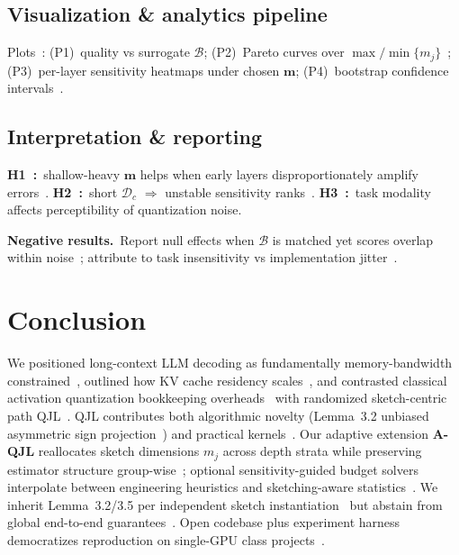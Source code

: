\documentclass[conference]{IEEEtran}
\begin{document}
\subsection{Visualization \& analytics pipeline}

Plots~\cite{presentation_mqjl}: (P1)~quality vs surrogate \(\mathcal{B}\); (P2)~Pareto curves over \(\max/\min\{m_j\}\)~\cite{fpguide2018}; (P3)~per-layer sensitivity heatmaps under chosen \(\mathbf{m}\); (P4)~bootstrap confidence intervals~\cite{presentation_mqjl}.

\subsection{Interpretation \& reporting}

\textbf{H1~\cite{fpguide2018}:}\ shallow-heavy \(\mathbf{m}\) helps when early layers disproportionately amplify errors~\cite{lipschitz2024}. \textbf{H2~\cite{presentation_mqjl}:}\ short \(\mathcal{D}_c\) \(\Rightarrow\) unstable sensitivity ranks~\cite{rudelson2014}. \textbf{H3~\cite{bai2023longbench}:}\ task modality affects perceptibility of quantization noise.

\textbf{Negative results.}\ Report null effects when \(\mathcal{B}\) is matched yet scores overlap within noise~\cite{presentation_mqjl}; attribute to task insensitivity vs implementation jitter~\cite{qjlkernel}.

\section{Conclusion}
\label{sec:conclusion}

We positioned long-context LLM decoding as fundamentally memory-bandwidth constrained~\cite{zandieh2024qjl}, outlined how KV cache residency scales~\cite{touvron2023llama}, and contrasted classical activation quantization bookkeeping overheads~\cite{kivi2024} with randomized sketch-centric path QJL~\cite{zandieh2024qjl}. QJL contributes both algorithmic novelty (Lemma~3.2 unbiased asymmetric sign projection~\cite{zandieh2024qjl}) and practical kernels~\cite{qjlkernel}. Our adaptive extension \textbf{A-QJL} reallocates sketch dimensions \(m_j\) across depth strata while preserving estimator structure group-wise~\cite{zandieh2024aqjl-repo}; optional sensitivity-guided budget solvers interpolate between engineering heuristics and sketching-aware statistics~\cite{woodruff2014,rudelson2014}. We inherit Lemma~3.2/3.5 per independent sketch instantiation~\cite{zandieh2024qjl} but abstain from global end-to-end guarantees~\cite{lipschitz2024}. Open codebase plus experiment harness democratizes reproduction on single-GPU class projects~\cite{bai2023longbench,presentation_mqjl}.
\end{document}
